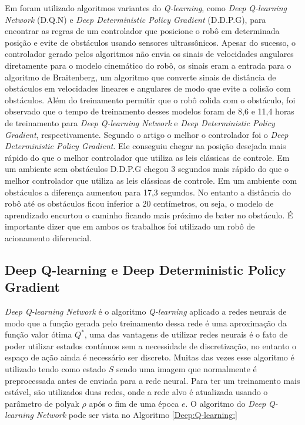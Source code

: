 Em \cite{quiroga2022position}
foram utilizado algoritmos variantes do \textit{Q-learning},
como \textit{Deep Q-learning Network} (D.Q.N) e
\textit{Deep Deterministic Policy Gradient} (D.D.P.G),
para encontrar as
regras de um controlador que posicione o robô em determinada
posição e evite de obstáculos usando sensores ultrassônicos.
Apesar do sucesso, o controlador gerado pelos algoritmos não envia
os sinais de velocidades angulares diretamente para o modelo cinemático
do robô, os sinais eram a entrada para o algoritmo de Braitenberg, um
algoritmo que converte sinais de distância de obstáculos em velocidades
lineares e angulares de modo que evite a colisão com obstáculos.
Além do treinamento permitir que o robô
colida com o obstáculo, foi observado que o tempo de treinamento desses modelos
foram de 8,6 e 11,4 horas de treinamento para \textit{Deep Q-learning Network}
e \textit{Deep Deterministic Policy Gradient}, respectivamente.
Segundo o
artigo o melhor o controlador foi o \textit{Deep Deterministic Policy Gradient}.
Ele conseguiu chegar na posição desejada mais rápido do que o
melhor controlador que utiliza as leis clássicas de controle.
Em um ambiente sem obstáculos D.D.P.G chegou 3 segundos mais rápido
do que o melhor controlador que utiliza as leis clássicas de controle.
Em um ambiente com obstáculos a diferença aumentou para
17,3 segundos. No entanto a distância do robô até os obstáculos ficou
inferior a 20 centímetros, ou seja, o modelo de aprendizado encurtou o
caminho ficando mais próximo de bater no obstáculo. É importante dizer que
em ambos os trabalhos foi utilizado um robô de acionamento diferencial.

\subsection{Deep Q-learning e Deep Deterministic Policy Gradient }
\textit{Deep Q-learning Network} é o algoritmo \textit{Q-learning}
aplicado a redes neurais de modo que a função gerada pelo treinamento
dessa rede é uma aproximação da função valor ótima $Q^*$, uma das vantagens
de utilizar redes neurais é o fato de poder utilizar estados contínuos sem a
necessidade de discretização, no entanto o espaço de ação ainda é necessário
ser discreto. Muitas das vezes esse algoritmo é utilizado
tendo como estado $S$ sendo uma imagem que normalmente é preprocessada
antes de enviada para a rede neural. Para ter um treinamento mais estável,
são utilizados duas redes, onde a rede alvo é atualizada usando o parâmetro
de polyak $\rho$ após o fim de uma época $e$.
O algoritmo do \textit{Deep Q-learning Network}
pode ser vista no Algoritmo \ref{Deep:Q-learning:}


